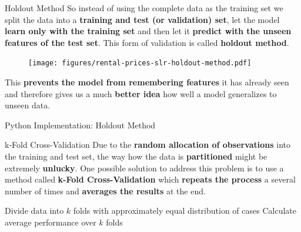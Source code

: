 \documentclass[main.tex]{subfiles}
\begin{document}
    \begin{frame}{Holdout Method}
            So instead of using the complete data as the training set we split the data into a \textbf{training and test (or validation) set}, let the model \textbf{learn only with the training set} and then let it \textbf{predict with the unseen features of the test set}. This form of validation is called \textbf{holdout method}.

            \begin{figure}
                \label{fig:rental-prices-slr-holdout-method}
                \texttt{[image: figures/rental-prices-slr-holdout-method.pdf]}
            \end{figure}
            
            This \textbf{prevents the model from remembering features} it has already seen and therefore gives us a much \textbf{better idea} how well a model generalizes to unseen data.
    \end{frame}

    \begin{frame}{Python Implementation: Holdout Method}
        
    \end{frame}
    
    \begin{frame}{k-Fold Cross-Validation}
        Due to the \textbf{random allocation of observations} into the training and test set, the way how the data is \textbf{partitioned} might be extremely \textbf{unlucky}. One possible solution to address this problem is to use a method called \textbf{k-Fold Cross-Validation} which \textbf{repeats the process} a several number of times and \textbf{averages the results} at the end.
        
        \begin{center}
            \begin{minipage}{.85\linewidth}
                \begin{algorithm}[H]
                    \DontPrintSemicolon
                    \caption{k-Fold Cross-Validation}
                    Divide data into $k$ folds with approximately equal distribution of cases\;
                    Calculate average performance over $k$ folds
                \end{algorithm}
            \end{minipage}
        \end{center}
    \end{frame}
\end{document}

